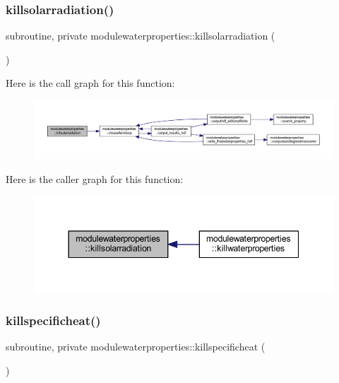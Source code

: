\subsubsection{\texorpdfstring{killsolarradiation()}{killsolarradiation()}}
{\footnotesize\ttfamily subroutine, private modulewaterproperties\+::killsolarradiation (\begin{DoxyParamCaption}{ }\end{DoxyParamCaption})\hspace{0.3cm}{\ttfamily [private]}}

Here is the call graph for this function\+:\nopagebreak
\begin{figure}[H]
\begin{center}
\leavevmode
\includegraphics[width=350pt]{namespacemodulewaterproperties_a656b771bc1432d56a5e5701857e3c914_cgraph}
\end{center}
\end{figure}
Here is the caller graph for this function\+:\nopagebreak
\begin{figure}[H]
\begin{center}
\leavevmode
\includegraphics[width=344pt]{namespacemodulewaterproperties_a656b771bc1432d56a5e5701857e3c914_icgraph}
\end{center}
\end{figure}
\mbox{\label{namespacemodulewaterproperties_a801b2f175ad723ebc00e21ea2c6616cf}} 
\subsubsection{\texorpdfstring{killspecificheat()}{killspecificheat()}}
{\footnotesize\ttfamily subroutine, private modulewaterproperties\+::killspecificheat (\begin{DoxyParamCaption}{ }\end{DoxyParamCaption})\hspace{0.3cm}{\ttfamily [private]}}


